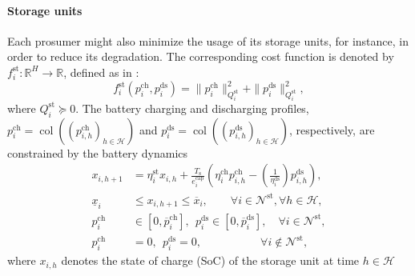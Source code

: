 \documentclass{IEEEtran}  %
\newcommand{\mc}{\mathcal}
\newcommand{\col}{\operatorname{col}}
\newcommand{\0}{\mathbf{0}}
\newcommand{\1}{\mathbf{1}}
\begin{document}
\paragraph*{Storage units} 
Each prosumer might also minimize the usage of its storage units, for instance, in order to reduce its degradation. The corresponding cost function is denoted by $f_{i}^{\mathrm{st}}:\mathbb{R}^{H} \to \mathbb{R}$, defined as in \cite{hans2018}:
\begin{equation}
f_{i}^{\mathrm{st}}(p_{i}^{\mathrm{ch}}, p_{i}^{\mathrm{ds}})= \|p_{i}^{\mathrm{ch}}\|_{Q_i^{\mathrm{st}}}^2 + \|p_{i}^{\mathrm{ds}}\|_{Q_i^{\mathrm{st}}}^2, \label{eq:f_st}
\end{equation}
where $Q_i^{\mathrm{st}}\succcurlyeq0$. {The battery charging and discharging profiles, $p_{i}^{\mathrm{ch}} = \col((p_{i,h}^{\mathrm{ch}})_{h\in \mc H})$ and $p_{i}^{\mathrm{ds}} = \col((p_{i,h}^{\mathrm{ds}})_{h\in \mc H})$, respectively, are constrained by the battery dynamics \cite{atzeni2013,zhong2019online}}
%
\begin{equation}
	\begin{aligned}
			x_{i,h+1} &=\eta_i^{\mathrm{st}} x_{i,h} +\frac{T_{\mathrm{s}}}{e^{\mathrm{cap}}_{i}}(\eta_i^{\mathrm{ch}} p_{i,h}^{\mathrm{ch}} -(\frac{1}{\eta_i^{\mathrm{ds}}})p_{i,h}^{\mathrm{ds}}), %
		\\
			\underline{x}_i &\leq x_{i,h+1} \leq \overline{x}_i,  \qquad \forall i \in \mc N^{\mathrm{st}}, \forall h \in \mc H,\\%
			{p}_{i}^{\mathrm{ch}} &\in [0,\overline{{p}}_{i}^{\mathrm{ch}}], \ \ {p}_{i}^{\mathrm{ds}} \in [0,\overline{{p}}_{i}^{\mathrm{ds}}],  \quad  \forall i \in \mc N^{\mathrm{st}},
	\\
		p_{i}^{\mathrm{ch}} &= 0, \ \ p_{i}^{\mathrm{ds}}= 0,\qquad \qquad \quad \  \forall i \notin \mc N^{\mathrm{st}},
	\end{aligned}
	\label{eq:x}
\end{equation}
where $x_{i,h} $ denotes the state of charge (SoC) of the storage unit at time $h \in \mc H$%
\end{document}

